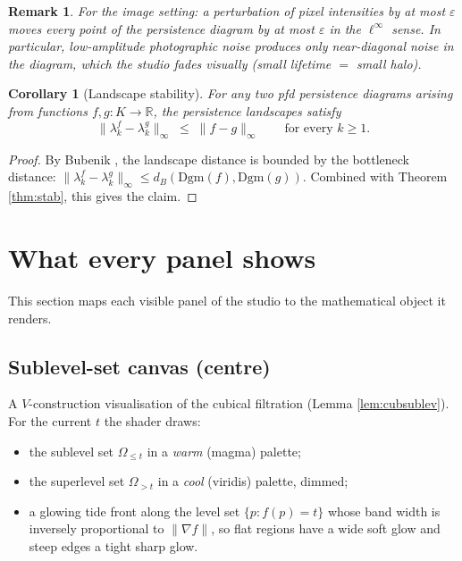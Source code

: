 \documentclass[11pt]{article}
\theoremstyle{persdef}
\newtheorem{corollary}[definition]{Corollary}
\newtheorem{remark}[definition]{Remark}
\newcommand{\R}{\mathbb{R}}
\newcommand{\sublevL}[2]{#1_{\leq #2}}
\newcommand{\sublevG}[2]{#1_{> #2}}
\newcommand{\PD}{\mathrm{Dgm}}
\newcommand{\Land}{\lambda}
\begin{document}
\begin{remark}\label{rem:stab}
For the image setting: a perturbation of pixel intensities by at most $\varepsilon$ moves every point of the persistence diagram by at most $\varepsilon$ in the $\ell^\infty$ sense. In particular, low-amplitude photographic noise produces only near-diagonal noise in the diagram, which the studio fades visually (small lifetime $=$ small halo).
\end{remark}

\begin{corollary}[Landscape stability]\label{cor:landstab}
For any two pfd persistence diagrams arising from functions $f,g:K\to\R$, the persistence landscapes satisfy
\[
\|\Land_k^f - \Land_k^g\|_\infty \;\leq\; \|f-g\|_\infty \qquad\text{for every }k\geq 1.
\]
\end{corollary}

\begin{proof}
By Bubenik \cite[Thm.~16]{Bub15}, the landscape distance is bounded by the bottleneck distance: $\|\Land^f_k - \Land^g_k\|_\infty \leq d_B(\PD(f),\PD(g))$. Combined with Theorem \ref{thm:stab}, this gives the claim.
\end{proof}

\section{What every panel shows}

This section maps each visible panel of the studio to the mathematical object it renders.

\subsection*{Sublevel-set canvas (centre)}
A $V$-construction visualisation of the cubical filtration (Lemma \ref{lem:cubsublev}). For the current $t$ the shader draws:
\begin{itemize}[leftmargin=2em,itemsep=0.2em]
  \item the sublevel set $\sublevL{\Omega}{t}$ in a \emph{warm} (magma) palette;
  \item the superlevel set $\sublevG{\Omega}{t}$ in a \emph{cool} (viridis) palette, dimmed;
  \item a glowing tide front along the level set $\{p:f(p)=t\}$ whose band width is inversely proportional to $\|\nabla f\|$, so flat regions have a wide soft glow and steep edges a tight sharp glow.
\end{itemize}
\end{document}
